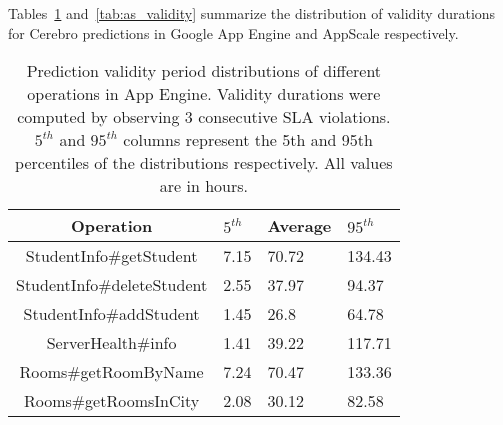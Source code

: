 

Tables~\ref{tab:gae_validity} and~\ref{tab:as_validity} summarize 
the distribution of validity 
durations for Cerebro predictions in Google App Engine and AppScale
respectively.
\begin{table}[htdp]
\caption{Prediction validity period distributions of different operations in
App Engine. Validity durations were computed by observing 3 consecutive SLA
violations. $5^{th}$ and $95^{th}$ columns represent the 5th and 95th 
percentiles of the
distributions respectively. All values are in hours.}
\begin{center}
\begin{tabular}{|c|p{1cm}|p{1cm}|p{1cm}|}
\hline
Operation & $5^{th}$ & Average & $95^{th}$ \\ \hline
StudentInfo\#getStudent & 7.15 & 70.72 & 134.43 \\ \hline
StudentInfo\#deleteStudent & 2.55 & 37.97 & 94.37 \\ \hline
StudentInfo\#addStudent & 1.45 & 26.8 & 64.78 \\ \hline
ServerHealth\#info & 1.41 & 39.22 & 117.71 \\ \hline
Rooms\#getRoomByName & 7.24 & 70.47 & 133.36 \\ \hline
Rooms\#getRoomsInCity & 2.08 & 30.12 & 82.58 \\ \hline
\end{tabular}
\end{center}
\label{tab:gae_validity}
\end{table}

